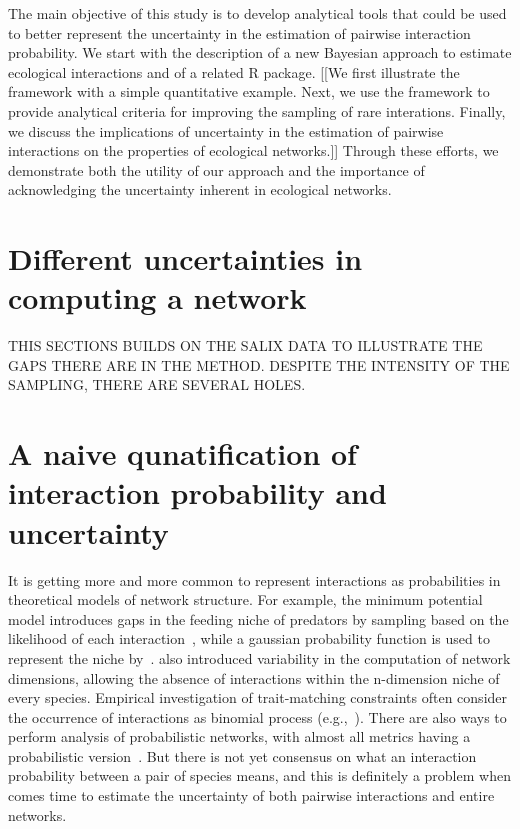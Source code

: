 ﻿\documentclass[12pt]{article}
\begin{document}
    The main objective of this study is to develop analytical tools that could be used to better represent the uncertainty in the estimation of pairwise interaction probability. We start with the description of a new Bayesian approach to estimate ecological interactions and of a related R package. [[We first illustrate the framework with a simple quantitative example. Next, we use the framework to provide analytical criteria for improving the sampling of rare interations. Finally, we discuss the implications of uncertainty in the estimation of pairwise interactions on the properties of ecological networks.]] Through these efforts, we demonstrate both the utility of our approach and the importance of acknowledging the uncertainty inherent in ecological networks.


\section*{Different uncertainties in computing a network}

THIS SECTIONS BUILDS ON THE SALIX DATA TO ILLUSTRATE THE GAPS THERE ARE IN THE METHOD. DESPITE THE INTENSITY OF THE SAMPLING, THERE ARE SEVERAL HOLES.



\section*{A naive qunatification of interaction probability and uncertainty}

  It is getting more and more common to represent interactions as probabilities in theoretical models of network structure. For example, the minimum potential model introduces gaps in the feeding niche of predators by sampling based on the likelihood of each interaction~\citep{Allesina2008}, while a gaussian probability function is used to represent the niche by~\citet{Williams2010}. \citet{Eklof2013} also introduced variability  in the computation of network dimensions, allowing the absence of interactions within the n-dimension niche of every species. Empirical investigation of trait-matching constraints often consider the occurrence of interactions as binomial process (e.g.,~\citealp{Rohr2016}). There are also ways to perform analysis of probabilistic networks, with almost all metrics having a probabilistic version~\citep{Poisot2016}. But there is not yet consensus on what an interaction probability between a pair of species means, and this is definitely a problem when comes time to estimate the uncertainty of both pairwise interactions and entire networks. 
\end{document}
